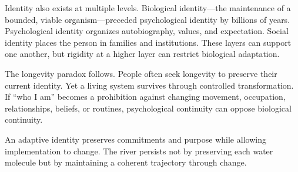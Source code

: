 Identity also exists at multiple levels. Biological identity---the maintenance of a bounded, viable organism---preceded psychological identity by billions of years. Psychological identity organizes autobiography, values, and expectation. Social identity places the person in families and institutions. These layers can support one another, but rigidity at a higher layer can restrict biological adaptation.

The longevity paradox follows. People often seek longevity to preserve their current identity. Yet a living system survives through controlled transformation. If ``who I am'' becomes a prohibition against changing movement, occupation, relationships, beliefs, or routines, psychological continuity can oppose biological continuity.

An adaptive identity preserves commitments and purpose while allowing implementation to change. The river persists not by preserving each water molecule but by maintaining a coherent trajectory through change.
